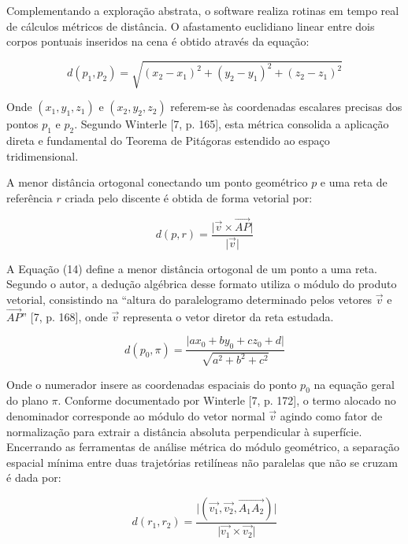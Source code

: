 \documentclass[conference,a4paper]{IEEEtran}
\begin{document}
Complementando a exploração abstrata, o software realiza rotinas em tempo real de cálculos métricos de distância. O afastamento euclidiano linear entre dois corpos pontuais inseridos na cena é obtido através da equação:

\begin{equation}
d(p_1,p_2) = \sqrt{(x_2-x_1)^2+(y_2-y_1)^2+(z_2-z_1)^2} \tag{13}
\end{equation}

Onde $(x_1, y_1, z_1)$ e $(x_2, y_2, z_2)$ referem-se às coordenadas escalares precisas dos pontos $p_1$ e $p_2$. Segundo Winterle [7, p. 165], esta métrica consolida a aplicação direta e fundamental do Teorema de Pitágoras estendido ao espaço tridimensional.

A menor distância ortogonal conectando um ponto geométrico $p$ e uma reta de referência $r$ criada pelo discente é obtida de forma vetorial por:

\begin{equation}
d(p,r) = \frac{\lvert \vec{v}\times \vec{AP}\rvert}{\lvert \vec{v}\rvert} \tag{14}
\end{equation}

A Equação (14) define a menor distância ortogonal de um ponto a uma reta. Segundo o autor, a dedução algébrica desse formato utiliza o módulo do produto vetorial, consistindo na ``altura do paralelogramo determinado pelos vetores $\vec{v}$ e $\vec{AP}$'' [7, p. 168], onde $\vec{v}$ representa o vetor diretor da reta estudada.

\begin{equation}
d(p_0,\pi) = \frac{\lvert a x_0 + b y_0 + c z_0 + d\rvert}{\sqrt{a^2+b^2+c^2}} \tag{15}
\end{equation}

Onde o numerador insere as coordenadas espaciais do ponto $p_0$ na equação geral do plano $\pi$. Conforme documentado por Winterle [7, p. 172], o termo alocado no denominador corresponde ao módulo do vetor normal $\vec{v}$ agindo como fator de normalização para extrair a distância absoluta perpendicular à superfície. Encerrando as ferramentas de análise métrica do módulo geométrico, a separação espacial mínima entre duas trajetórias retilíneas não paralelas que não se cruzam é dada por:

\begin{equation}
d(r_1,r_2) = \frac{\lvert(\vec{v_1},\vec{v_2},\vec{A_1A_2})\rvert}{\lvert \vec{v_1}\times \vec{v_2}\rvert} \tag{16}
\end{equation}
\end{document}
